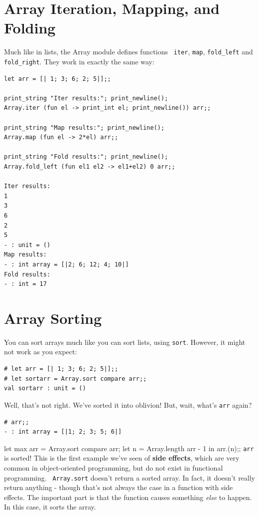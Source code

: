 \documentclass[10pt]{book}
\begin{document}
{\section{Array Iteration, Mapping, and Folding}

Much like in lists, the Array module defines functions {\tt 
iter}, {\tt map}, {\tt \verb"fold_left"} and {\tt \verb"fold_right"}. 
They work in exactly the same way:

\beforeverb
\begin{verbatim}
let arr = [| 1; 3; 6; 2; 5|];;

print_string "Iter results:"; print_newline();
Array.iter (fun el -> print_int el; print_newline()) arr;;

print_string "Map results:"; print_newline();
Array.map (fun el -> 2*el) arr;;

print_string "Fold results:"; print_newline();
Array.fold_left (fun el1 el2 -> el1+el2) 0 arr;;

Iter results:
1
3
6
2
5
- : unit = ()
Map results:
- : int array = [|2; 6; 12; 4; 10|]
Fold results:
- : int = 17
\end{verbatim}
\afterverb

\section{Array Sorting}

You can sort arrays much like you can sort lists, using
{\tt sort}. However, it might not work as you expect:

\beforeverb
\begin{verbatim}
# let arr = [| 1; 3; 6; 2; 5|];;
# let sortarr = Array.sort compare arr;;
val sortarr : unit = ()
\end{verbatim}
\afterverb
Well, that's not right. We've sorted it into oblivion! 
But, wait, what's {\tt arr} again?

\beforeverb
\begin{verbatim}
# arr;;
- : int array = [|1; 2; 3; 5; 6|]
\end{verbatim}
\afterverb
let max arr = 
	Array.sort compare arr;
	let n = Array.length arr - 1 in 	
	arr.(n);;
{\tt arr} is sorted! This is the first example we've seen of 
{\bf side effects}, which are very common in object-oriented 
programming, but do not exist in functional programming. {\tt 
Array.sort} doesn't return a sorted array. In fact, it doesn't
really return anything - though that's not always the case in 
a function with side effects. The important part is that the 
function causes something {\it else} to happen. In this case, 
it sorts the array.

}
\end{document}
